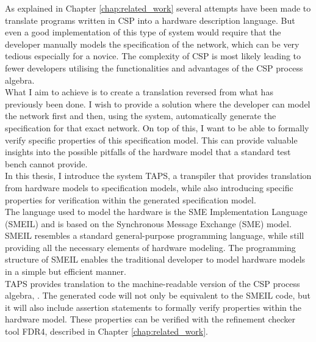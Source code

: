 %



As explained in Chapter \ref{chap:related_work} several attempts have been made to translate programs written in CSP into a hardware description language. But even a good implementation of this type of system would require that the developer manually models the specification of the \cspm{} network, which can be very tedious especially for a novice.
The complexity of CSP is most likely leading to fewer developers utilising the functionalities and advantages of the CSP process algebra.\\

What I aim to achieve is to create a translation reversed from what has previously been done. I wish to provide a solution where the developer can model the network first and then, using the system, automatically generate the specification for that exact network. On top of this, I want to be able to formally verify specific properties of this specification model. This can provide valuable insights into the possible pitfalls of the hardware model that a standard test bench cannot provide.\\

In this thesis, I introduce the system TAPS, a transpiler that provides translation from hardware models to specification models, while also introducing specific properties for verification within the generated specification model.\\

The language used to model the hardware is the SME Implementation Language (SMEIL) and is based on the Synchronous Message Exchange (SME) model. SMEIL resembles a standard general-purpose programming language, while still providing all the necessary elements of hardware modeling. The programming structure of SMEIL enables the traditional developer to model hardware models in a simple but efficient manner.\\

TAPS provides translation to the machine-readable version of the CSP process algebra, \cspm{}. The generated \cspm{} code will not only be equivalent to the SMEIL code, but it will also include assertion statements to formally verify properties within the hardware model. These properties can be verified with the \cspm{} refinement checker tool FDR4, described in Chapter \ref{chap:related_work}.

